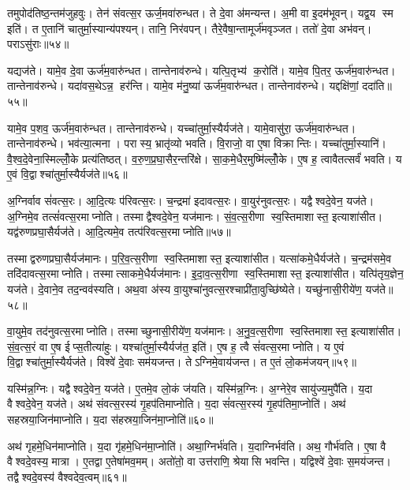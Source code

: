 तमुपोद॑तिष्ठ॒न्तम॑जुहवुः।
तेन॑ संवत्स॒र ऊर्ज॒मवा॑रुन्धत।
ते दे॒वा अ॑मन्यन्त।
अ॒मी वा इ॒दम॑भूवन्।
यद्व॒य स्म इति॑।
त ए॒तानि॑ चातुर्मा॒स्यान्य॑पश्यन्।
तानि॒ निर॑वपन्।
तैरे॒वैषा॒न्तामूर्ज॑मवृञ्जत।
ततो॑ दे॒वा अभ॑वन्।
पराऽसु॑राः॥५४॥

यद्यज॑ते।
यामे॒व दे॒वा ऊर्ज॑म॒वारु॑न्धत।
तान्तेनाव॑रुन्धे।
यत्पि॒तृभ्य॑ क॒रोति॑।
यामे॒व पि॒तर॒ ऊर्ज॑म॒वारु॑न्धत।
तान्तेनाव॑रुन्धे।
यदा॑वस॒थेऽन्न॒ हर॑न्ति।
यामे॒व म॑नु॒ष्या॑ ऊर्ज॑म॒वारु॑न्धत।
तान्तेनाव॑रुन्धे।
यद्दक्षि॑णां॒ ददा॑ति॥५५॥

यामे॒व प॒शव॒ ऊर्ज॑म॒वारु॑न्धत।
तान्तेनाव॑रुन्धे।
यच्चा॑तुर्मा॒स्यैर्यज॑ते।
यामे॒वासु॑रा॒ ऊर्ज॑म॒वारु॑न्धत।
तान्तेनाव॑रुन्धे।
भव॑त्या॒त्मना।
परास्य॒ भ्रातृ॑व्यो भवति।
वि॒राजो॒ वा ए॒षा विक्रान्तिः।
यच्चा॑तुर्मा॒स्यानि॑।
वै॒श्व॒दे॒वेना॒स्मिल्लोँ॒के प्रत्य॑तिष्ठत्।
व॒रु॒ण॒प्र॒घा॒सैर॒न्तरि॑क्षे।
सा॒क॒मे॒धैर॒मुष्मि॑ल्लोँ॒के।
ए॒ष ह॒ त्वावैतत्सर्वं॑ भवति।
य ए॒वं वि॒द्वाश्चा॑तुर्मा॒स्यैर्यज॑ते॥५६॥

अ॒ग्निर्वाव सं॑वत्स॒रः।
आ॒दि॒त्यः प॑रिवत्स॒रः।
च॒न्द्रमा॑ इदावत्स॒रः।
वा॒युर॑नुवत्स॒रः।
यद्वैश्वदे॒वेन॒ यज॑ते।
अ॒ग्निमे॒व तत्सं॑वत्स॒रमाप्नोति।
तस्माद्वैश्वदे॒वेन॒ यज॑मानः।
सं॒व॒त्स॒रीणा स्व॒स्तिमाशास्त॒ इत्याशा॑सीत।
यद्व॑रुण\-प्रघा॒सैर्यज॑ते।
आ॒दि॒त्यमे॒व तत्प॑रिवत्स॒रमाप्नोति॥५७॥

तस्माद्वरुणप्रघा॒सैर्यज॑मानः।
प॒रि॒व॒त्स॒रीणा स्व॒स्तिमाशास्त॒ इत्याशा॑सीत।
यत्सा॑कमे॒धैर्यज॑ते।
च॒न्द्रम॑समे॒व तदि॑दावत्स॒र\-माप्नोति।
तस्मात्साकमे॒धैर्यज॑मानः।
इ॒दा॒व॒त्स॒रीणा स्व॒स्तिमाशास्त॒ इत्याशा॑सीत।
यत्पि॑तृय॒ज्ञेन॒ यज॑ते।
दे॒वाने॒व तद॒न्वव॑स्यति।
अथ॒वा अ॑स्य वा॒युश्चा॑नुवत्स॒रश्चाप्री॑ता॒\-वुच्छि॑ष्येते।
यच्छु॑नासी॒रीये॑ण॒ यज॑ते॥५८॥

वा॒युमे॒व तद॑नुवत्स॒रमाप्नोति।
तस्माच्छुनासी॒रीये॑ण॒ यज॑मानः।
अ॒नु॒व॒त्स॒रीणा स्व॒स्तिमाशास्त॒ इत्याशा॑सीत।
सं॒व॒त्स॒रं वा ए॒ष ईप्स॒तीत्या॑हुः।
यश्चा॑तुर्मा॒स्यैर्यज॑त॒ इति॑।
ए॒ष ह॒ त्वै सं॑वत्स॒रमाप्नोति।
य ए॒वं वि॒द्वाश्चा॑तुर्मा॒स्यैर्यज॑ते।
विश्वे॑ दे॒वाः सम॑यजन्त।
तेऽग्निमे॒वाय॑जन्त।
त ए॒तं लो॒कम॑जयन्॥५९॥

यस्मि॑न्न॒ग्निः।
यद्वैश्वदे॒वेन॒ यज॑ते।
ए॒तमे॒व लो॒कं ज॑यति।
यस्मि॑न्न॒ग्निः।
अ॒ग्नेरे॒व सायु॑ज्य॒मुपै॑ति।
य॒दा वैश्वदे॒वेन॒ यज॑ते।
अथ॑ संवत्स॒रस्य॑ गृ॒हप॑तिमाप्नोति।
य॒दा सं॑वत्स॒रस्य॑ गृ॒हप॑तिमा॒प्नोति॑।
अथ॑ सहस्रया॒जिन॑माप्नोति।
य॒दा स॑हस्रया॒जिन॑मा॒प्नोति॑॥६०॥

अथ॑ गृहमे॒धिन॑माप्नोति।
य॒दा गृ॑हमे॒धिन॑मा॒प्नोति॑।
अथा॒ग्निर्भ॑वति।
य॒दाग्निर्भव॑ति।
अथ॒ गौर्भ॑वति।
ए॒षा वै वैश्वदे॒वस्य॒ मात्रा।
ए॒तद्वा ए॒तेषा॑मव॒मम्।
अतो॑तो॒ वा उत्त॑राणि॒ श्रेयासि भवन्ति।
यद्विश्वे॑ दे॒वाः स॒मय॑जन्त।
तद्वैश्वदे॒वस्य॑ वैश्वदेव॒त्वम्॥६१॥


